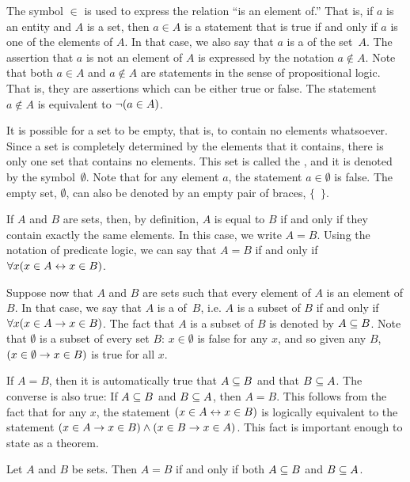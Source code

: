 The symbol $\in$ is used to express the relation ``is an element of.''
That is, if $a$ is an entity and $A$ is a set, then $a\in A$ is a statement
that is true if and only if $a$ is one of the elements of $A$.  In that
case, we also say that $a$ is a  of
the set~$A$.  The assertion that $a$ is not an element of $A$ is
expressed by the notation $a\not\in A$.  Note that both $a\in A$
and $a\not\in A$ are statements in the sense of propositional logic.
That is, they are assertions which can be either true or false.
The statement $a\not\in A$ is equivalent to $\lnot(a\in A)$.

It is possible for a set to be empty, that is, to contain no elements
whatsoever.  Since a set is completely determined by the elements
that it contains, there is only one set that contains no elements.
This set is called the , and it is denoted by the
symbol~$\emptyset$.  Note that for any element $a$, the
statement $a\in\emptyset$ is false.  The empty set, $\emptyset$, can also
be denoted by an empty pair of braces, $\{$~$\}$.

If $A$ and $B$ are sets, then, by definition, $A$ is equal to $B$ if and only
if they contain exactly the same elements.  In this case, we write $A=B$.
Using the notation of predicate logic, we can say that $A=B$ if and only
if $\forall x(x\in A \leftrightarrow x\in B)$.  

Suppose now that $A$ and $B$ are sets such that every element of $A$ is
an element of $B$.  
In that case, we say that $A$ is a  of~$B$, i.e. $A$ is a subset
of $B$ if and only if  $\forall x(x\in A \rightarrow x\in B)$. The fact that 
$A$ is a subset of $B$ is denoted by $A\subseteq B$.  Note that $\emptyset$ is a
subset of every set $B$: $x \in \emptyset$ is false for any $x$, and so given
any $B$, $(x\in \emptyset \rightarrow x\in B)$ is true for all $x$.

If $A=B$, then it is automatically true that $A\subseteq B$ and that
$B\subseteq A$.  The converse is also true: If $A\subseteq B$ and $B\subseteq A$,
then $A=B$.  This follows from the fact that for any $x$, the statement 
$(x\in A \leftrightarrow x\in B)$ is logically equivalent to the statement $(x\in A\rightarrow x\in B)
\wedge (x\in B\rightarrow x\in A)$.  This fact is important enough to state as a
theorem.

\begin{theorem}\label{T-setequality}
Let $A$ and $B$ be sets.  Then $A=B$ if and only if both $A\subseteq B$ and $B\subseteq A$.
\end{theorem}

